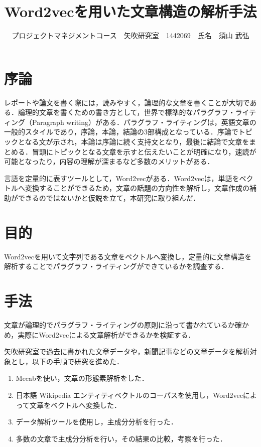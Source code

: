 \documentclass[uplatex,twocolumn,dvipdfmx]{jsarticle}
\title{\vspace{-5mm}\fontsize{14pt}{0pt}\selectfont Word2vecを用いた文章構造の解析手法}
\author{\normalsize プロジェクトマネジメントコース　矢吹研究室　1442069　氏名　須山 武弘}
\date{}
\begin{document}
\fontsize{10.5pt}{\baselineskip}\selectfont
\maketitle





\section{序論}\label{序論}
レポートや論文を書く際には，読みやすく，論理的な文章を書くことが大切である．論理的文章を書くための書き方として，世界で標準的なパラグラフ・ライティング（Paragraph writing）がある\cite{02}．パラグラフ・ライティングは，英語文章の一般的スタイルであり，序論，本論，結論の3部構成となっている．序論でトピックとなる文が示され，本論は序論に続く支持文となり，最後に結論で文章をまとめる．冒頭にトピックとなる文章を示すと伝えたいことが明確になり，速読が可能となったり，内容の理解が深まるなど多数のメリットがある．

言語を定量的に表すツールとして，Word2vecがある．Word2vecは，単語をベクトルへ変換することができるため，文章の話題の方向性を解析し，文章作成の補助ができるのではないかと仮説を立て，本研究に取り組んだ\cite{01}．

\section{目的}
Word2vecを用いて文字列である文章をベクトルへ変換し，定量的に文章構造を解析することでパラグラフ・ライティングができているかを調査する．

\section{手法}

文章が論理的でパラグラフ・ライティングの原則に沿って書かれているか確かめ，実際にWord2vecによる文章解析ができるかを検証する．

矢吹研究室で過去に書かれた文章データや，新聞記事などの文章データを解析対象とし，以下の手順で研究を進めた．
\begin{enumerate}
 \item Mecabを使い，文章の形態素解析をした．
 \item 日本語 Wikipedia エンティティベクトルのコーパスを使用し，Word2vecによって文章をベクトルへ変換した．
 \item データ解析ツールを使用し，主成分分析を行った．
 \item 多数の文章で主成分分析を行い，その結果の比較，考察を行った．
\end{enumerate}
\end{document}
